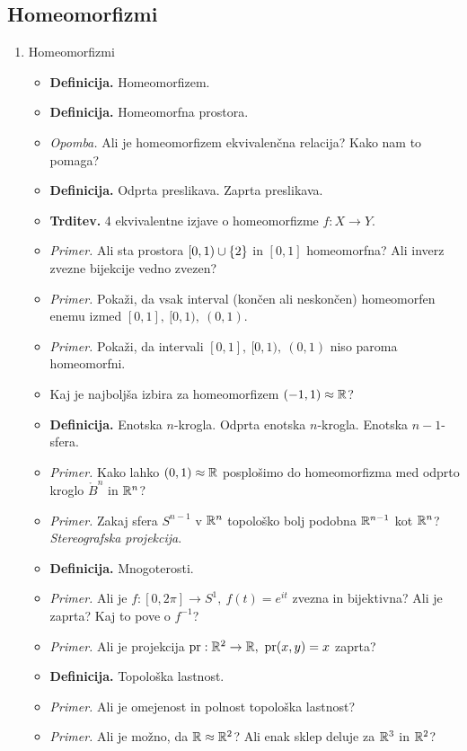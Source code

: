 \newpage
\subsection{Homeomorfizmi}
\begin{enumerate}
    \item Homeomorfizmi
    \begin{itemize}
        \item \colorbox{purple!30}{\textbf{Definicija.}} Homeomorfizem.
        \item \colorbox{purple!30}{\textbf{Definicija.}} Homeomorfna prostora.
        \item \colorbox{yellow!30}{\emph{Opomba.}} Ali je homeomorfizem ekvivalenčna relacija? Kako nam to pomaga?
        \item \colorbox{purple!30}{\textbf{Definicija.}} Odprta preslikava. Zaprta preslikava.
        \item \colorbox{blue!30}{\textbf{Trditev.}} 4 ekvivalentne izjave o homeomorfizme $f: X \to Y$.
        \item \colorbox{yellow!30}{\emph{Primer.}} Ali sta prostora $[0, 1) \cup \left\{2\right\}$ in $[0,1]$ homeomorfna? Ali inverz zvezne bijekcije vedno zvezen?
        \item \colorbox{yellow!30}{\emph{Primer.}} Pokaži, da vsak interval (končen ali neskončen) homeomorfen enemu izmed $[0,1], \ [0, 1), \ (0,1)$.
        \item \colorbox{yellow!30}{\emph{Primer.}} Pokaži, da intervali $[0,1], \ [0, 1), \ (0,1)$ niso paroma homeomorfni.
        \item Kaj je najboljša izbira za homeomorfizem $(-1, 1) \approx \mathbb{R}$?
        \item \colorbox{purple!30}{\textbf{Definicija.}} Enotska $n$-krogla. Odprta enotska $n$-krogla. Enotska $n-1$-sfera.
        \item \colorbox{yellow!30}{\emph{Primer.}} Kako lahko $(0, 1) \approx \mathbb{R}$ posplošimo do homeomorfizma med odprto kroglo $\mathring{B}^n$ in $\mathbb{R}^n$?
        \item \colorbox{yellow!30}{\emph{Primer.}} Zakaj sfera $S^{n-1}$ v $\mathbb{R}^n$ topološko bolj podobna $\mathbb{R}^{n-1}$ kot $\mathbb{R}^n$? \emph{Stereografska projekcija}.
        \item \colorbox{purple!30}{\textbf{Definicija.}} Mnogoterosti.
        \item \colorbox{yellow!30}{\emph{Primer.}}  Ali je $f: [0, 2 \pi] \to S^1, \ f(t) = e^{it}$ zvezna in bijektivna? Ali je zaprta? Kaj to pove o $f^{-1}$?
        \item \colorbox{yellow!30}{\emph{Primer.}} Ali je projekcija $\pr: \R^2 \to \R, \ \pr(x,y) = x$ zaprta?
        \item \colorbox{purple!30}{\textbf{Definicija.}} Topološka lastnost.
        \item \colorbox{yellow!30}{\emph{Primer.}} Ali je omejenost in polnost topološka lastnost?
        \item \colorbox{yellow!30}{\emph{Primer.}} Ali je možno, da $\mathbb{R} \approx \mathbb{R}^2$? Ali enak sklep deluje za $\mathbb{R}^3$ in $\mathbb{R}^2$?
    \end{itemize}
\end{enumerate}

